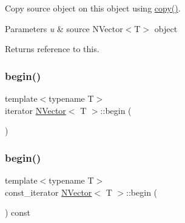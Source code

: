 Copy source object on this object using \mbox{\hyperlink{class_n_vector_a67128d2ff536b8ccd7a95cb680bd0431}{copy()}}. 


\begin{DoxyParams}{Parameters}
{\em u} & source N\+Vector$<$\+T$>$ object \\
\hline
\end{DoxyParams}
\begin{DoxyReturn}{Returns}
reference to this. 
\end{DoxyReturn}
\mbox{\label{class_n_vector_ae71ea78f955c0512a1dd005c335f956a}} 
\subsubsection{\texorpdfstring{begin()}{begin()}\hspace{0.1cm}{\footnotesize\ttfamily [1/2]}}
{\footnotesize\ttfamily template$<$typename T$>$ \\
iterator \mbox{\hyperlink{class_n_vector}{N\+Vector}}$<$ T $>$\+::begin (\begin{DoxyParamCaption}{ }\end{DoxyParamCaption})\hspace{0.3cm}{\ttfamily [inline]}}

\mbox{\label{class_n_vector_a39aa7aecfd17e2db8130f5fbc956bb8f}} 
\subsubsection{\texorpdfstring{begin()}{begin()}\hspace{0.1cm}{\footnotesize\ttfamily [2/2]}}
{\footnotesize\ttfamily template$<$typename T$>$ \\
const\+\_\+iterator \mbox{\hyperlink{class_n_vector}{N\+Vector}}$<$ T $>$\+::begin (\begin{DoxyParamCaption}{ }\end{DoxyParamCaption}) const\hspace{0.3cm}{\ttfamily [inline]}}

\mbox{\label{class_n_vector_a11675cb00213e89ae5a563f59d0f4ff3}} 
